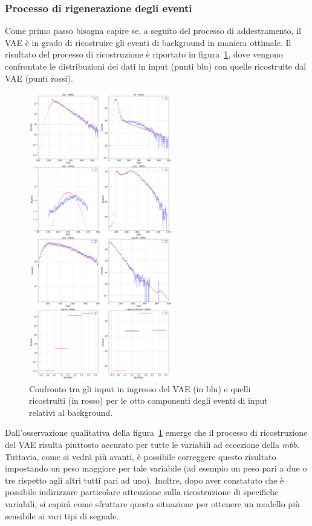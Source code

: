 \subsubsection{Processo di rigenerazione degli eventi}
\label{rigenerazione_eventi}
Come primo passo bisogna capire se, a seguito del processo di addestramento, il VAE è in grado di ricostruire gli eventi di background in maniera ottimale. Il risultato del processo di ricostruzione è riportato in figura~\ref{ricostruzione}, dove vengono confrontate le distribuzioni dei dati in input (punti blu) con quelle ricostruite dal VAE (punti rossi). 
\begin{figure}[h!]
	\centering
	\includegraphics[width=0.56\textwidth]{figs/risultati_simulazione/ricostruzione.png}
	\caption{Confronto tra gli input in ingresso del VAE (in blu) e quelli ricostruiti (in rosso) per le otto componenti degli eventi di input relativi al background.}
	\label{ricostruzione}
\end{figure}

Dall'osservazione qualitativa della figura~\ref{ricostruzione} emerge che il processo di ricostruzione del VAE risulta piuttosto accurato per tutte le variabili ad eccezione della $\textit{mbb}$. \\
Tuttavia, come si vedrà più avanti, è possibile correggere questo risultato impostando un peso maggiore per tale variabile (ad esempio un peso pari a due o tre rispetto agli altri tutti pari ad uno). Inoltre, dopo aver constatato che è possibile indirizzare particolare attenzione sulla ricostruzione di specifiche variabili, si capirà come sfruttare questa situazione per ottenere un modello più sensibile ai vari tipi di segnale.\\


